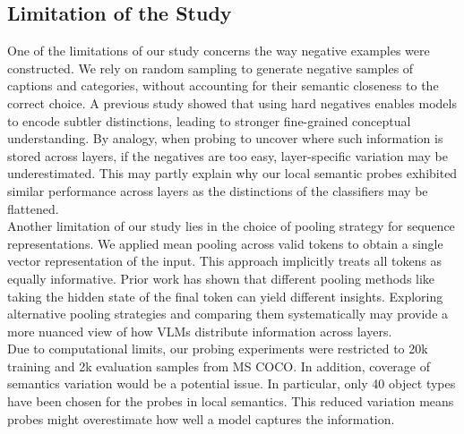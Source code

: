 \documentclass[11pt]{article}
\begin{document}
\subsection{Limitation of the Study}
One of the limitations of our study concerns the way negative examples were constructed. We rely on random sampling to generate negative samples of captions and categories, without accounting for their semantic closeness to the correct choice.
A previous study \cite{roesch2024EnhancingConceptualUnderstandinginMultimodal} showed that using hard negatives enables models to encode subtler distinctions, leading to stronger fine-grained conceptual understanding.
By analogy, when probing to uncover where such information is stored across layers, if the negatives are too easy, layer-specific variation may be underestimated.
This may partly explain why our local semantic probes exhibited similar performance across layers as the distinctions of the classifiers may be flattened. \\

Another limitation of our study lies in the choice of pooling strategy for sequence representations.
We applied mean pooling across valid tokens to obtain a single vector representation of the input. This approach implicitly treats all tokens as equally informative.
Prior work \cite{tang2024PoolingAndAttention} has shown that different pooling methods like taking the hidden state of the final token can yield different insights. Exploring alternative pooling strategies and comparing them systematically may provide a more nuanced view of how VLMs distribute information across layers. \\

Due to computational limits, our probing experiments were restricted to 20k training and 2k evaluation samples from MS COCO.
In addition, coverage of semantics variation would be a potential issue.
In particular, only 40 object types have been chosen for the probes in local semantics.
This reduced variation means probes might overestimate how well a model captures the information.
\end{document}
